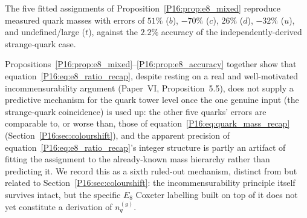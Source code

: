 \begin{proposition}
\label{P16:prop:e8_accuracy}
The five fitted assignments of Proposition~\ref{P16:prop:e8_mixed}
reproduce measured quark masses with errors of $51\%$ ($b$), $-70\%$ ($c$),
$26\%$ ($d$), $-32\%$ ($u$), and undefined/large ($t$), against the
$2.2\%$ accuracy of the independently-derived strange-quark case.
\end{proposition}

\begin{remark}
\label{P16:rem:e8_negative_result}
Propositions~\ref{P16:prop:e8_mixed}--\ref{P16:prop:e8_accuracy} together show
that equation~\eqref{P16:eq:e8_ratio_recap}, despite resting on a real and
well-motivated incommensurability argument (Paper~VI,
Proposition~5.5), does not supply a predictive mechanism for the
quark tower level once the one genuine input (the strange-quark
coincidence) is used up: the other five quarks' errors are comparable
to, or worse than, those of equation~\eqref{P16:eq:quark_mass_recap}
(Section~\ref{P16:sec:colourshift}), and the apparent precision of
equation~\eqref{P16:eq:e8_ratio_recap}'s integer structure is partly an
artifact of fitting the assignment to the already-known mass hierarchy
rather than predicting it. We record this as a sixth ruled-out
mechanism, distinct from but related to Section~\ref{P16:sec:colourshift}:
the incommensurability principle itself survives intact, but the
specific $E_8$ Coxeter labelling built on top of it does not yet
constitute a derivation of $n_q^{(g)}$.
\end{remark}

